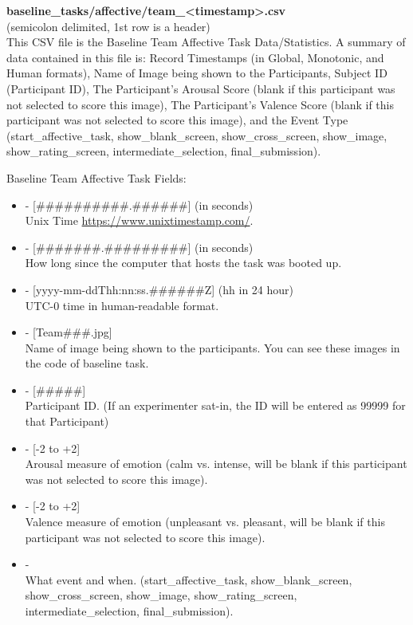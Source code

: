 \begin{description}
\medskip
\item\textbf{baseline\_tasks/affective/team\_<timestamp>.csv}\\(semicolon delimited, 1st row is a header)\\
This CSV file is the Baseline Team Affective Task Data/Statistics. A summary of data contained in this file is: Record Timestamps (in Global, Monotonic, and Human formats), Name of Image being shown to the Participants, Subject ID (Participant ID), The Participant's Arousal Score (blank if this participant was not selected to score this image), The Participant's Valence Score (blank if this participant was not selected to score this image), and the Event Type (start\_affective\_task, show\_blank\_screen, show\_cross\_screen, show\_image, show\_rating\_screen, intermediate\_selection, final\_submission).

Baseline Team Affective Task Fields:
\begin{itemize}
    \item {} - [\#\#\#\#\#\#\#\#\#\#.\#\#\#\#\#\#] (in seconds)\\Unix Time \href{https://www.unixtimestamp.com/}{https://www.unixtimestamp.com/}.
    \item {} - [\#\#\#\#\#\#\#.\#\#\#\#\#\#\#\#\#] (in seconds)\\How long since the computer that hosts the task was booted up.
    \item {} - [yyyy-mm-ddThh:nn:ss.\#\#\#\#\#\#Z] (hh in 24 hour)\\ UTC-0 time in human-readable format.
    \item {} - [Team\#\#\#.jpg]\\Name of image being shown to the participants. You can see these images in the code of baseline task.
    \item {} - [\#\#\#\#\#]\\Participant ID. (If an experimenter sat-in, the ID will be entered as 99999 for that Participant)
    \item {} - [-2 to +2]\\Arousal measure of emotion (calm vs. intense, will be blank if this participant was not selected to score this image).
    \item {} - [-2 to +2]\\Valence measure of emotion (unpleasant vs. pleasant, will be blank if this participant was not selected to score this image).
    \item {} -\\What event and when. (start\_affective\_task, show\_blank\_screen, show\_cross\_screen, show\_image, show\_rating\_screen, intermediate\_selection, final\_submission).
\end{itemize}



\end{description}
